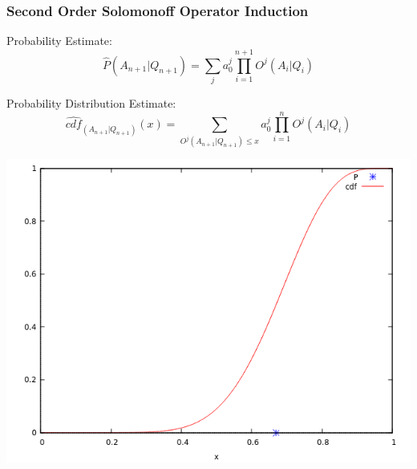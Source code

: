 \documentclass{beamer}
\begin{document}
\begin{frame}
  \frametitle{Second Order Solomonoff Operator Induction}

  
  Probability Estimate:
  $$
  \hat{P}(A_{n+1}|Q_{n+1}) = \sum_j a_0^j \prod_{i=1}^{n+1} O^j(A_i|Q_i)
  $$

  
  Probability Distribution Estimate:
  $$
    \hat{cdf}_{(A_{n+1}|Q_{n+1})}(x) = \sum_{O^j(A_{n+1}|Q_{n+1}) \le x}
    a_0^j \prod_{i=1}^{n} O^j(A_i|Q_i)
  $$



  \begin{center}
    \includegraphics[scale=0.28]{images/P_vs_CDF.png}
  \end{center}


\end{frame}
\end{document}
